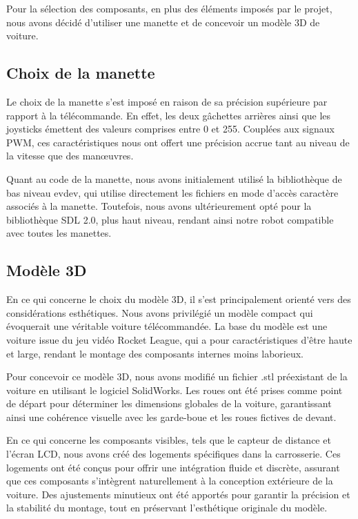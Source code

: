 Pour la sélection des composants, en plus des éléments imposés par le projet, nous avons décidé d'utiliser une manette et de concevoir un modèle 3D de voiture.

\subsection{Choix de la manette}
Le choix de la manette s'est imposé en raison de sa précision supérieure par rapport à la télécommande. En effet, les deux gâchettes arrières ainsi que les joysticks émettent des valeurs comprises entre 0 et 255. Couplées aux signaux PWM, ces caractéristiques nous ont offert une précision accrue tant au niveau de la vitesse que des manœuvres.

Quant au code de la manette, nous avons initialement utilisé la bibliothèque de bas niveau evdev, qui utilise directement les fichiers en mode d'accès caractère associés à la manette. Toutefois, nous avons ultérieurement opté pour la bibliothèque SDL 2.0, plus haut niveau, rendant ainsi notre robot compatible avec toutes les manettes.

\subsection{Modèle 3D}
En ce qui concerne le choix du modèle 3D, il s'est principalement orienté vers des considérations esthétiques. Nous avons privilégié un modèle compact qui évoquerait une véritable voiture télécommandée. La base du modèle est une voiture issue du jeu vidéo Rocket League, qui a pour caractéristiques d'être haute et large, rendant le montage des composants internes moins laborieux.

Pour concevoir ce modèle 3D, nous avons modifié un fichier .stl préexistant de la voiture en utilisant le logiciel SolidWorks. Les roues ont été prises comme point de départ pour déterminer les dimensions globales de la voiture, garantissant ainsi une cohérence visuelle avec les garde-boue et les roues fictives de devant. 

En ce qui concerne les composants visibles, tels que le capteur de distance et l'écran LCD, nous avons créé des logements spécifiques dans la carrosserie. Ces logements ont été conçus pour offrir une intégration fluide et discrète, assurant que ces composants s'intègrent naturellement à la conception extérieure de la voiture. Des ajustements minutieux ont été apportés pour garantir la précision et la stabilité du montage, tout en préservant l'esthétique originale du modèle.

